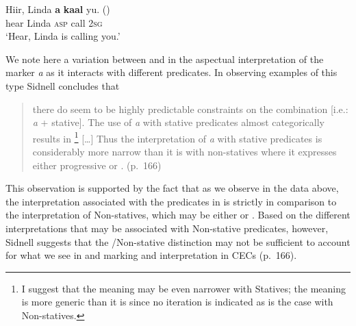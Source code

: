 \ex
\gll Hiir, Linda \textbf{a} \textbf{kaal}        yu. ()\\
	hear Linda \textsc{asp}         call \textsc{2sg}\\
\glt `Hear, Linda is calling you.' \z \z

We note here a variation between  and  in the
aspectual interpretation of the marker \textit{a} as it interacts with
different predicates.  In observing examples of this type Sidnell
concludes that

\begin{quote}
there do seem to be highly predictable constraints on the combination
[i.e.: \textit{a} + stative]. The use of \textit{a} with stative
predicates almost categorically results in \footnote{I
  suggest that the meaning may be even narrower with Statives; the
  meaning is more generic than it is  since no iteration is
  indicated as is the case with Non-statives.} […] Thus the interpretation
of \textit{a} with stative predicates is considerably more narrow than
it is with non-statives where it expresses either progressive or
. (p.~166)
\end{quote}

This observation is supported by the fact that as we observe in the
data above, the interpretation associated with the  predicates
in  is strictly  in comparison to the interpretation of
Non-statives, which may be either  or .  Based on
the different interpretations that may be associated with Non-stative
predicates, however, Sidnell suggests that the \slash Non-stative
distinction may not be sufficient to account for what we see in 
and  marking and interpretation in CECs (p.~166).

